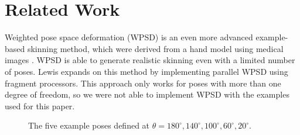 \documentclass[11pt,twocolumn,letterpaper]{article}
\begin{document}
\section{Related Work}

Weighted pose space deformation (WPSD) is an even more advanced example-based skinning method, which were derived from a hand model using medical images \cite{kurihara2004modeling}. WPSD is able to generate realistic skinning even with a limited number of poses. Lewis \cite{rhee2006real} expands on this method by implementing parallel WPSD using fragment processors. This approach only works for poses with more than one degree of freedom, so we were not able to implement WPSD with the examples used for this paper.

\begin{figure}
\begin{center}
\end{center}
   \caption{The five example poses defined at $\theta = 180^{\circ}, 140^{\circ}, 100^{\circ}, 60^{\circ}, 20^{\circ}$.}
\label{fig:short}
\label{poses}
\end{figure}
\end{document}

